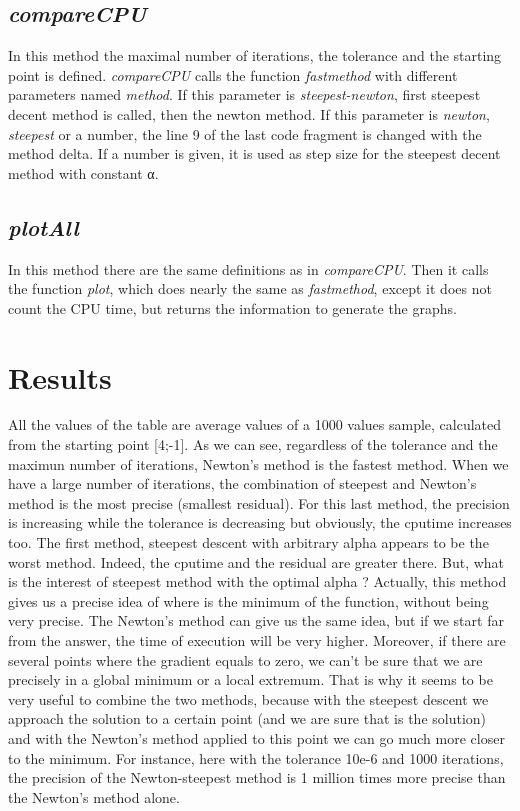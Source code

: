 \documentclass[a4paper,12pt]{article}
\newcommand{\code}[1]{\textit{#1}}
\begin{document}
\subsection{\code{compareCPU}}
In this method the maximal number of iterations, the tolerance and the starting point is defined.
\code{compareCPU} calls the function \code{fastmethod} with different parameters named \code{method}.
If this parameter is \code{steepest-newton}, first steepest decent method is called, then the newton method.
If this parameter is \code{newton}, \code{steepest} or a number, the line 9 of the last code fragment is changed with the method delta. 
If a number is given, it is used as step size for the steepest decent method with constant α.
\subsection{\code{plotAll}}
In this method there are the same definitions as in \code{compareCPU}.
Then it calls the function \code{plot}, which does nearly the same as \code{fastmethod}, except it does not count the CPU time, but returns the information to generate the graphs.

\section{Results}


All the values of the table are average values of a 1000 values sample, calculated from the starting point [4;-1].
As we can see, regardless of the tolerance and the maximun number of iterations, Newton's method is the fastest method. 
When we have a large number of iterations, the combination of steepest and Newton's method is the most precise (smallest residual). 
For this last method, the precision is increasing while the tolerance is decreasing but obviously, the cputime increases too.
The first method, steepest descent with arbitrary alpha appears to be the worst method. Indeed, the cputime and the residual are greater there. 
But, what is the interest of steepest method with the optimal alpha ? 
Actually, this method gives us a precise idea of where is the minimum of the function, without being very precise. 
The Newton's method can give us the same idea, but if we start far from the answer, the time of execution will be very higher. 
Moreover, if there are several points where the gradient equals to zero, we can't be sure that we are precisely in a global minimum or a local extremum. 
That is why it seems to be very useful to combine the two methods, because with the steepest descent we approach the solution to a certain point (and we are sure that is the solution) and with the Newton's method applied to this point we can go much more closer to the minimum. 
For instance, here with the tolerance 10e-6 and 1000 iterations, the precision of the Newton-steepest method is 1 million times more precise than the Newton's method alone. 
\end{document}
